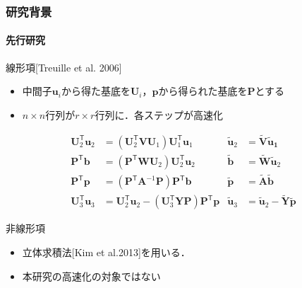 \documentclass[aspectratio=169,dvipdfmx,hyperref={bookmarks=true}]{beamer}
\begin{document}
\begin{frame}
\frametitle{研究背景}
\framesubtitle{先行研究}
	\begin{block}{線形項\cite{projection_base}[Treuille et al. 2006]}
	   \begin{itemize}
   	\item 中間子$\bm{u}_i$から得た基底を$\bm{U}_i$，$\bm{p}$から得られた基底を$\bm{P}$とする
	\item $n\times n$行列が$r \times r$行列に．各ステップが高速化
	\end{itemize}
\begin{align*}
 \bm{U}_2^{\mathsf T}\bm{u}_2	& = (\bm{U}_2^{\mathsf T}\bm{V}\bm{U}_1)\bm{U}_1^{\mathsf T}\bm{u}_1 					&\bm{\widetilde{u}}_2 		&= \bm{\widetilde{V}}\bm{\widetilde{u}_1}	\\
 \bm{P}^{\mathsf T}\bm{b}		& = (\bm{P}^{\mathsf T}\bm{W}\bm{U}_2)\bm{U}_2^{\mathsf T}\bm{u}_2        				&\bm{\widetilde{b}}			&= \bm{\widetilde{W}}\bm{\widetilde{u}}_2	\\
 \bm{P}^{\mathsf T}\bm{p} 		&= (\bm{P}^{\mathsf T}\bm{A}^{-1}\bm{P})\bm{P}^{\mathsf T}\bm{b}						&\bm{\widetilde{p}}			&= \bm{\widetilde{A}}\bm{\widetilde{b}}\\
 \bm{U}_3^{\mathsf T}\bm{u}_3 	&=  \bm{U}_2^{\mathsf T}\bm{u}_2 - (\bm{U}_3^{\mathsf T}\bm{Y}\bm{P})\bm{P}^{\mathsf T}\bm{p}	&\bm{\widetilde{u}}_3		&= \bm{\widetilde{u}}_2  -  \bm{\widetilde{Y}}\bm{\widetilde{p}}
\end{align*}
\end{block}

	\begin{block}{非線形項}
 		\begin{itemize}
		\item 立体求積法\cite{subspace}[Kim et al.2013]を用いる．
		\item 本研究の高速化の対象ではない
	\end{itemize}
	\end{block}
\end{frame}

\end{document}
